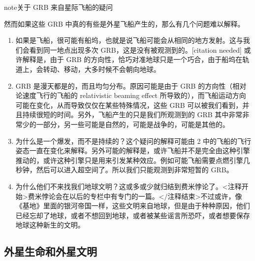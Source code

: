 \documentclass[letterpaper,10pt,english]{sphinxmanual}
\begin{document}
\begin{notice}{note}{关于 GRB 来自星际飞船的疑问}

然而如果这些 GRB 中真的有些是外星飞船产生的，那么有几个问题难以解释。
\begin{enumerate}
\item {} 
如果是飞船，很可能有船坞，也就是说飞船可能会从相同的地方发射。这与我们会看到同一地点出现多次 GRB，这是没有被观测到的。{[}citation needed{]} 或许解释是，由于 GRB 的方向性，恰巧对准地球只是一个巧合，由于船坞在轨道上，会转动、移动，大多时候不会朝向地球。

\item {} 
GRB 是漫天都是的，而且均匀分布。原因可能是由于 GRB 的方向性（相对论速度飞行的飞船的 relativistic beaming effect 所导致的），而飞船运动方向可能在变化，从而导致仅仅在某些特殊情况，这些 GRB 可以被我们看到，并且持续很短的时间。另外，飞船产生的只是我们所观测到的 GRB 其中非常非常少的一部分，另一些可能是自然的，可能是战争的，可能是其他的。

\item {} 
为什么是一个爆发，而不是持续的？这个疑问的解释可能由 2 中的飞船的飞行姿态一直在变化来解释。另外可能的解释是，或许飞船并不是完全由这种引擎推动的，或许这种引擎只是用来引发某种效应。例如可能飞船需要点燃引擎几秒钟，然后可以进入超空间了。所以我们只能观测到非常短暂的 GRB。

\item {} 
为什么他们不来找我们地球文明？这或多或少就归结到费米悖论了。\textless{}注释开始\textgreater{}费米悖论会在以后的专栏中有专门的一篇。\textless{}/注释结束\textgreater{}不过或许，像《基地》里面的银河帝国一样，这些文明来自地球，但是由于种种原因，他们已经忘却了地球，或者不想回到地球，或者被某些谣言所恐吓，或者想要保存地球这种新生的文明。

\end{enumerate}
\end{notice}


\subsection{外星生命和外星文明}
\label{physics:id26}
\end{document}
